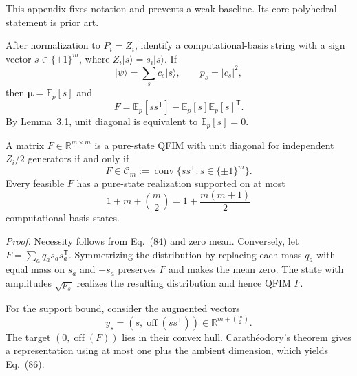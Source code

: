 \documentclass[11pt]{article}
\newcommand{\Sect}[1]{\vspace{0.35em}{\large\bfseries #1}\par\vspace{0.25em}}
\newcommand{\SubSect}[1]{\vspace{0.22em}{\large\bfseries #1}\par\vspace{0.18em}}
\newcommand{\Prop}[1]{\vspace{0.35em}{\bfseries #1}\par\vspace{0.12em}}
\begin{document}
\clearpage
\setcounter{page}{48}
\thispagestyle{plain}
\fontsize{9.7}{11.7}\selectfont
\Sect{G\quad Full unit-diagonal feasibility as background}
This appendix fixes notation and prevents a weak baseline. Its core polyhedral statement is prior art.

\SubSect{G.1\quad The symmetric-Bernoulli correlation sector}
After normalization to $P_i=Z_i$, identify a computational-basis string with a sign vector $s\in\{\pm1\}^m$, where $Z_i\lvert s\rangle=s_i\lvert s\rangle$. If
\begin{equation}
  \lvert\psi\rangle=\sum_s c_s\lvert s\rangle,
  \qquad p_s=\lvert c_s\rvert^2,
  \tag{83}
\end{equation}
then $\boldsymbol\mu=\mathbb E_p[s]$ and
\begin{equation}
  F=\mathbb E_p[ss^{\mathsf T}]-\mathbb E_p[s]\mathbb E_p[s]^{\mathsf T}.
  \tag{84}
\end{equation}
By Lemma~3.1, unit diagonal is equivalent to $\mathbb E_p[s]=0$.

\Prop{Proposition G.1 (full-sector normal form; classical geometry plus pure-state realization).}
A matrix $F\in\mathbb R^{m\times m}$ is a pure-state QFIM with unit diagonal for independent $Z_i/2$ generators if and only if
\begin{equation}
  F\in\mathcal C_m:=\operatorname{conv}\{ss^{\mathsf T}:s\in\{\pm1\}^m\}.
  \tag{85}
\end{equation}
Every feasible $F$ has a pure-state realization supported on at most
\begin{equation}
  1+m+\binom m2=1+\frac{m(m+1)}2
  \tag{86}
\end{equation}
computational-basis states.

\emph{Proof.} Necessity follows from Eq.~(84) and zero mean. Conversely, let
$F=\sum_a q_as_as_a^{\mathsf T}$. Symmetrizing the distribution by replacing each mass $q_a$ with equal mass on $s_a$ and $-s_a$ preserves $F$ and makes the mean zero. The state with amplitudes $\sqrt{p_s}$ realizes the resulting distribution and hence QFIM $F$.

For the support bound, consider the augmented vectors
\begin{equation}
  y_s=(s,\operatorname{off}(ss^{\mathsf T}))\in
  \mathbb R^{m+\binom m2}.
  \tag{87}
\end{equation}
The target $(0,\operatorname{off}(F))$ lies in their convex hull. Carath\'eodory's theorem gives a representation using at most one plus the ambient dimension, which yields Eq.~(86).
\end{document}

